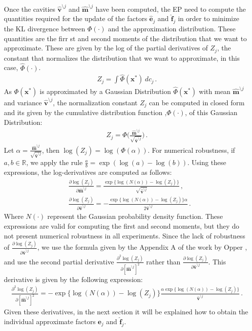 Once the cavities $\boldsymbol{\hat{v}}^{\setminus j}$ and $\boldsymbol{\hat{m}}^{\setminus j}$ have been computed, the EP need to compute the quantities required for the update of the factors $\boldsymbol{\hat{e}}_{j}$ and $\boldsymbol{\hat{f}}_{j}$ in order to minimize the KL divergence between $\Phi(\cdot)$ and the approximation distribution. These quantities are the firr
st and second moments of the distribution that we want to approximate. These are given by the log of the partial derivatives of $Z_j$, the constant that normalizes the distribution that we want to approximate, in this case, $\hat{\Phi}(\cdot)$.
\begin{align}
Z_j = \int \hat{\Phi}(\boldsymbol{x}^*)\ dc_j\,.
\end{align}
As $\Phi(\boldsymbol{x}^*)$ is approximated by a Gaussian Distribution $\hat{\Phi}(\boldsymbol{x}^*)$ with mean $\boldsymbol{\hat{m}}^{\setminus j}$ and variance $\boldsymbol{\hat{v}}^{\setminus j}$, the normalization constant $Z_j$ can be computed in closed form and its given by the cumulative distribution function ,$\Phi(\cdot)$, of this Gaussian Distribution:
\begin{align}
Z_j = \Phi\Bigg(\frac{\boldsymbol{\hat{m}}^{\setminus j}}{\sqrt{\boldsymbol{\hat{v}}^{\setminus j}}}\Bigg)\,.
\end{align}
Let $\alpha =  \frac{\boldsymbol{\hat{m}}^{\setminus j}}{\sqrt{\boldsymbol{\hat{v}}^{\setminus j}}}$, then $\log(Z_j) = \log(\Phi(\alpha))$. For numerical robustness, if $a,b \in \mathbb{R}$, we apply the rule $ \frac{a}{b} = \exp{(\log(a)-\log(b))}$. Using these expressions, the log-derivatives are computed as follows:
\begin{align}
& \frac{\partial \log(Z_j)}{\partial \boldsymbol{\hat{m}}^{\setminus j}} = \frac{\exp\{\log(N(\alpha))-\log(Z_j)\}}{\sqrt{\boldsymbol{\hat{v}}^{\setminus j}}}\,, \nonumber \\
& \frac{\partial \log(Z_j)}{\partial \boldsymbol{\hat{v}}^{\setminus j}} = - \frac{\exp\{\log(N(\alpha))-\log(Z_j)\}\alpha}{2\boldsymbol{\hat{v}}^{\setminus j}}\,.
\end{align}
Where $N(\cdot)$ represent the Gaussian probability density function. These expressions are valid for computing the first and second moments, but they do not present numerical robustness in all experiments. Since the lack of robustness of $\frac{\partial \log(Z_j)}{\partial \boldsymbol{\hat{v}}^{\setminus j}}$, we use the formula given by the Appendix A of the work by Opper \citep{opper2009variational}, and use the second partial derivative $\frac{\partial^{2} \log(Z_j)}{\partial [\boldsymbol{\hat{m}}^{\setminus j}]^2}$ rather than $\frac{\partial \log(Z_j)}{\partial \boldsymbol{\hat{v}}^{\setminus j}}$. This derivative is given by the following expression:
\begin{align}
\frac{\partial^{2} \log(Z_j)}{\partial [\boldsymbol{\hat{m}}^{\setminus j}]^2} = - \exp\{\log(N(\alpha))-\log(Z_j)\}\frac{\alpha\exp\{\log(N(\alpha))-\log(Z_j)\}}{\boldsymbol{\hat{v}}^{\setminus j}}\,.
\end{align}
Given these derivatives, in the next section it will be explained how to obtain the individual approximate factors $\boldsymbol{\hat{e}}_{j}$ and $\boldsymbol{\hat{f}}_{j}$.

